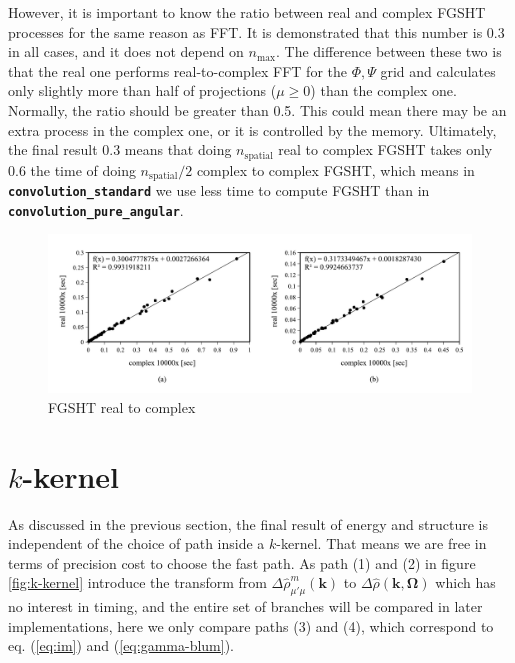 However, it is important to know the ratio between real and complex
FGSHT processes for the same reason as FFT. It is demonstrated that this number
is 0.3 in all cases, and it does not depend on $n_{\max}$. The difference
between these two is that the real one performs real-to-complex FFT
for the $\Phi,\Psi$ grid and calculates only slightly more than half of
projections ($\mu\geq0$) than the complex one. Normally, the ratio
should be greater than 0.5. This could mean there may be an extra process
in the complex one, or it is controlled by the memory. Ultimately, the
final result 0.3 means that doing $n_{\mathrm{spatial}}$ real to
complex FGSHT takes only 0.6 the time of doing $n_{\mathrm{spatial}}/2$
complex to complex FGSHT, which means in \texttt{\textbf{convolution\_standard}}
we use less time to compute FGSHT than in \texttt{\textbf{convolution\_pure\_angular}}.
\begin{center}
\begin{figure}[H]
\begin{centering}
\includegraphics[bb=0bp 20bp 680bp 235bp,width=1\columnwidth]{_figure/results/fgsht_real_v_cmplx}
\par\end{centering}
\caption{FGSHT real to complex\label{fig:fgsht-real-to-complex}}
\end{figure}
\par\end{center}

\section{$k$-kernel}

As discussed in the previous section, the final result of energy and
structure is independent of the choice of path inside a $k$-kernel.
That means we are free in terms of precision cost to choose the fast path.
As path (1) and (2) in figure \ref{fig:k-kernel} introduce the transform
from $\Delta\hat{\rho}_{\mu'\mu}^{m}(\mathbf{k})$ to $\Delta\hat{\rho}(\mathbf{k},\mathbf{\Omega})$
which has no interest in timing, and the entire set of branches will be compared
in later implementations, here we only compare paths (3) and (4),
which correspond to eq. (\ref{eq:im}) and (\ref{eq:gamma-blum}).

